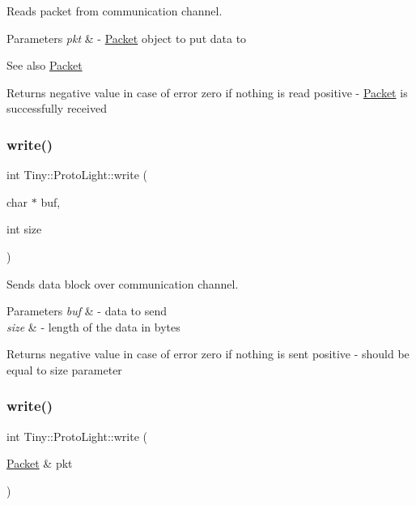 Reads packet from communication channel. 
\begin{DoxyParams}{Parameters}
{\em pkt} & -\/ \hyperlink{classTiny_1_1Packet}{Packet} object to put data to \\
\hline
\end{DoxyParams}
\begin{DoxySeeAlso}{See also}
\hyperlink{classTiny_1_1Packet}{Packet} 
\end{DoxySeeAlso}
\begin{DoxyReturn}{Returns}
negative value in case of error zero if nothing is read positive -\/ \hyperlink{classTiny_1_1Packet}{Packet} is successfully received 
\end{DoxyReturn}
\mbox{\label{classTiny_1_1ProtoLight_a46a27ee9d0b55c88672c98abf04dbdce}} 
\subsubsection{\texorpdfstring{write()}{write()}\hspace{0.1cm}{\footnotesize\ttfamily [1/2]}}
{\footnotesize\ttfamily int Tiny\+::\+Proto\+Light\+::write (\begin{DoxyParamCaption}\item[{char $\ast$}]{buf,  }\item[{int}]{size }\end{DoxyParamCaption})}

Sends data block over communication channel. 
\begin{DoxyParams}{Parameters}
{\em buf} & -\/ data to send \\
\hline
{\em size} & -\/ length of the data in bytes \\
\hline
\end{DoxyParams}
\begin{DoxyReturn}{Returns}
negative value in case of error zero if nothing is sent positive -\/ should be equal to size parameter 
\end{DoxyReturn}
\mbox{\label{classTiny_1_1ProtoLight_abf2966531f8ed7dba44079f00eefded2}} 
\subsubsection{\texorpdfstring{write()}{write()}\hspace{0.1cm}{\footnotesize\ttfamily [2/2]}}
{\footnotesize\ttfamily int Tiny\+::\+Proto\+Light\+::write (\begin{DoxyParamCaption}\item[{\hyperlink{classTiny_1_1Packet}{Packet} \&}]{pkt }\end{DoxyParamCaption})}

